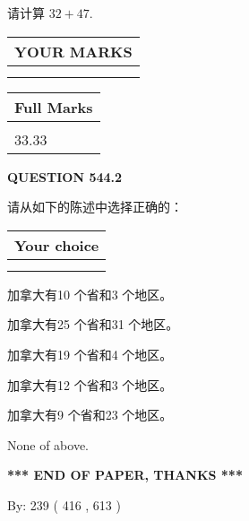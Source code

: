 \documentclass{ctexart}
\begin{document}
  
 
请计算 $ %
32 +  %
47 $.
 

 

 
  
\vspace{0.2in}
  
\noindent\begin{tabular}{|l|}
\hline
 YOUR MARKS  \\
\hline
 \\ 
 \\ 
\hline
\end{tabular}
\hspace{0.05in} \begin{tabular}{|l|}
\hline
 Full Marks  \\
\hline
 \\ 
33.33 \\
\hline
\end{tabular}
{\textbf{\Large{QUESTION
544.2 
}}}
  
  
请从如下的陈述中选择正确的：
  
  
\noindent\hspace{3.0in} \begin{tabular}{|l|}
\hline
Your choice \\
\hline
 \\ 
 \\ 
\hline
\end{tabular}
  
  
 
 
加拿大有10 个省和3 个地区。
 
 
加拿大有25 个省和31 个地区。
 
 
加拿大有19 个省和4 个地区。
 
 
加拿大有12 个省和3 个地区。
 
 
加拿大有9 个省和23 个地区。
 
 
 None of above.
 
 
   
   
 \vspace{0.2in}
 
   
   
   
   
\vspace{1.0in} 
{\textbf{\large{ *** END OF PAPER, THANKS *** }}} 
   
   
\hspace{1.0in} By: 
 239 ( 416 ,  613 )
   
\end{document}
